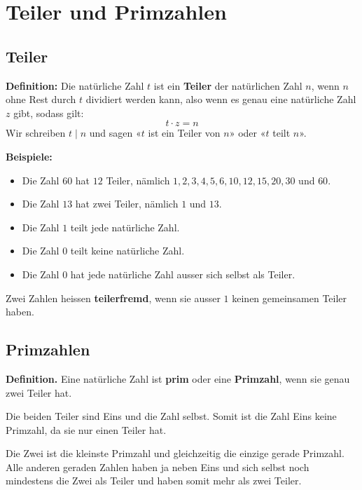 \newpage
\section{Teiler und Primzahlen}

\subsection{Teiler}

\textbf{Definition:} Die natürliche Zahl $t$ ist ein \textbf{Teiler} der natürlichen Zahl $n$, wenn $n$ ohne Rest durch $t$ dividiert werden kann, also wenn es genau eine natürliche Zahl $z$ gibt, sodass gilt:
  \[
    t\cdot z = n
  \]
Wir schreiben $t\mid n$ und sagen «$t$ ist ein Teiler von $n$» oder «$t$ teilt $n$».
\begin{example}
  \textbf{Beispiele:}
  \begin{itemize}[noitemsep]
    \item Die Zahl $60$ hat $12$ Teiler, nämlich $1, 2, 3, 4, 5, 6, 10, 12, 15, 20, 30$ und $60$.
    \item Die Zahl $13$ hat zwei Teiler, nämlich $1$ und $13$.
    \item Die Zahl $1$ teilt jede natürliche Zahl.
    \item Die Zahl $0$ teilt keine natürliche Zahl.
    \item Die Zahl $0$ hat jede natürliche Zahl ausser sich selbst als Teiler.
  \end{itemize}
\end{example}

Zwei Zahlen heissen \textbf{teilerfremd}, wenn sie ausser $1$ keinen gemeinsamen Teiler haben.

\subsection{Primzahlen}

\textbf{Definition.} Eine natürliche Zahl ist \textbf{prim} oder eine \textbf{Primzahl}, wenn sie genau zwei Teiler hat.

Die beiden Teiler sind Eins und die Zahl selbst. Somit ist die Zahl Eins keine Primzahl, da sie nur einen Teiler hat.

Die Zwei ist die kleinste Primzahl und gleichzeitig die einzige gerade Primzahl. Alle anderen geraden Zahlen haben ja neben Eins und sich selbst noch mindestens die Zwei als Teiler und haben somit mehr als zwei Teiler.

